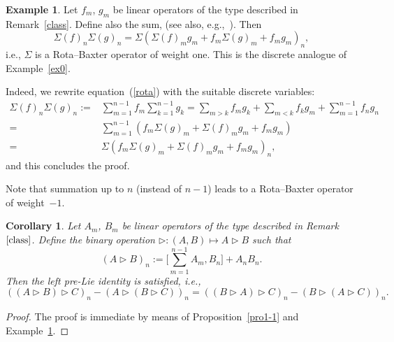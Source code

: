 \documentclass[pdftex]{sigma}
\numberwithin{equation}{section}
\newtheorem{cor}[thm]{Corollary}
\theoremstyle{definition}
\newtheorem{exam}[thm]{Example}
\begin{document}
\begin{exam} \label{ex2}
 Let $f_m$, $g_m $ be linear operators of the type described in Remark~\ref{class}. Define also the sum,  (see also, e.g.,~\cite{EbraMan}). Then{\samepage
\begin{equation}
\Sigma(f)_n\Sigma(g)_n = \Sigma(\Sigma(f)_mg_m + f_m \Sigma(g)_m +f_mg_m )_n, \label{rota}
\end{equation}
i.e., $\Sigma$ is a Rota--Baxter operator of weight one. This is the discrete analogue of Example~\ref{ex0}.}

Indeed, we rewrite equation~(\ref{rota}) with the suitable discrete variables:
\begin{align*}
\Sigma(f)_n \Sigma(g)_n:={}& \sum_{m=1}^{n-1} f_m \sum_{k=1}^{n-1} g_k = \sum_{m> k}f_m g_k +
\sum_{m< k} f_k g_m +\sum_{m=1}^{n-1} f_ng_n \\
={}&\sum_{m=1}^{n-1} (f_m \Sigma(g)_m + \Sigma(f)_m g_m +f_m g_m ) \\
={}& \Sigma(f_m \Sigma(g)_m+ \Sigma(f)_m g _m +f_mg_m )_n,
\end{align*}
and this concludes the proof.

Note that summation up to $n$ (instead of $n-1$) leads to a Rota--Baxter operator of weight~$-1$.
\end{exam}

\begin{cor} \label{corb} Let $A_m$, $B_m$ be linear operators of the type described in Remark~$\ref{class}$. Define the binary operation
$ \triangleright\colon (A, B) \mapsto A \triangleright B$ such that
\begin{equation}
(A\triangleright B)_n := \Biggl[ \sum_{m=1}^{n-1} A_m, B_n \Biggr] +A_n B_n. \label{bina2}
\end{equation}
Then the left pre-Lie identity is satisfied, i.e.,
\begin{equation*}
 ((A\triangleright B)\triangleright C )_n - (A\triangleright (B\triangleright C) )_n =
 ((B\triangleright A)\triangleright C )_n - (B\triangleright (A\triangleright C) )_n. %
\end{equation*}
\end{cor}
\begin{proof} The proof is immediate by means of Proposition~\ref{pro1-1} and Example~\ref{ex2}.
\end{proof}
\end{document}
